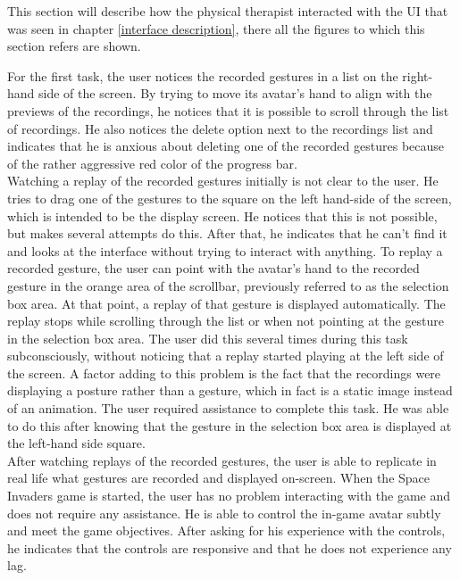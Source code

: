 This section will describe how the physical therapist interacted with the UI that was seen in chapter \ref{interface description}, there all the figures to which this section refers are shown.

For the first task, the user notices the recorded gestures in a list on the right-hand side of the screen. By trying to move its avatar's hand to align with the previews of the recordings, he notices that it is possible to scroll through the list of recordings. He also notices the delete option next to the recordings list and indicates that he is anxious about deleting one of the recorded gestures because of the rather aggressive red color of the progress bar.\\

Watching a replay of the recorded gestures initially is not clear to the user. He tries to drag one of the gestures to the square on the left hand-side of the screen, which is intended to be the display screen. He notices that this is not possible, but makes several attempts do this. After that, he indicates that he can't find it and looks at the interface without trying to interact with anything. To replay a recorded gesture, the user can point with the avatar's hand to the recorded gesture in the orange area of the scrollbar, previously referred to as the selection box area. At that point, a replay of that gesture is displayed automatically. The replay stops while scrolling through the list or when not pointing at the gesture in the selection box area. The user did this several times during this task subconsciously, without noticing that a replay started playing at the left side of the screen. A factor adding to this problem is the fact that the recordings were displaying a posture rather than a gesture, which in fact is a static image instead of an animation. The user required assistance to complete this task. He was able to do this after knowing that the gesture in the selection box area is displayed at the left-hand side square.\\

After watching replays of the recorded gestures, the user is able to replicate in real life what gestures are recorded and displayed on-screen. When the Space Invaders game is started, the user has no problem interacting with the game and does not require any assistance. He is able to control the in-game avatar subtly and meet the game objectives. After asking for his experience with the controls, he indicates that the controls are responsive and that he does not experience any lag.\\

